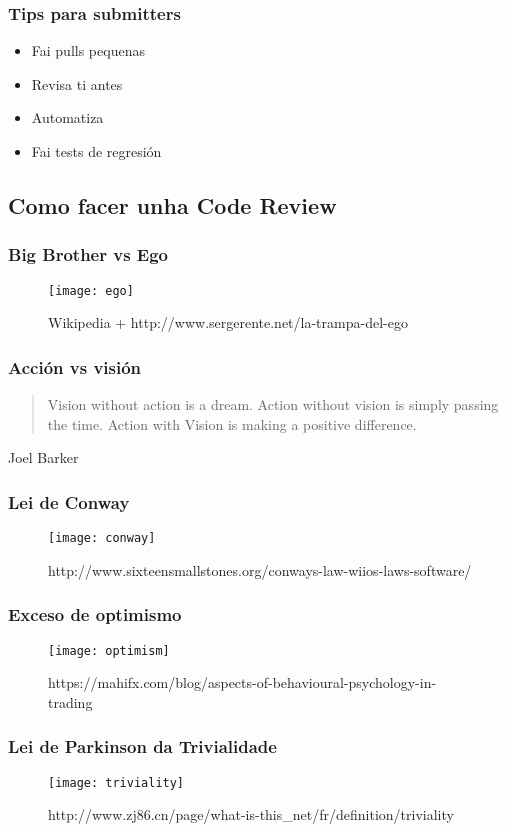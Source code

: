 \begin{frame}
  \frametitle{Tips para submitters}
  \begin{itemize}
    \item Fai pulls pequenas
    \item Revisa ti antes
    \item Automatiza
    \item Fai tests de regresión
  \end{itemize}
\end{frame}

\subsection{Como facer unha Code Review}
\label{subsec:Como}

\begin{frame}
  \frametitle{Big Brother vs Ego}
  \begin{figure}[ht]
    \centering
    \texttt{[image: ego]}
    \caption{Wikipedia + http://www.sergerente.net/la-trampa-del-ego}
  \end{figure}
\end{frame}

\begin{frame}
  \frametitle{Acción vs visión}
  \blockquote{Vision without action is a dream. Action without vision is simply passing the time. Action with Vision is making a positive difference.}
  Joel Barker
\end{frame}

\begin{frame}
  \frametitle{Lei de Conway}
  \begin{figure}[ht]
    \centering
    \texttt{[image: conway]}
    \caption{http://www.sixteensmallstones.org/conways-law-wiios-laws-software/}
  \end{figure}
\end{frame}

\begin{frame}
  \frametitle{Exceso de optimismo}
  \begin{figure}[ht]
    \centering
    \texttt{[image: optimism]}
    \caption{https://mahifx.com/blog/aspects-of-behavioural-psychology-in-trading}
  \end{figure}
\end{frame}

\begin{frame}
  \frametitle{Lei de Parkinson da Trivialidade}
  \begin{figure}[ht]
    \centering
    \texttt{[image: triviality]}
    \caption{http://www.zj86.cn/page/what-is-this\_net/fr/definition/triviality}
  \end{figure}
\end{frame}

